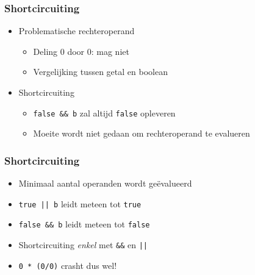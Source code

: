 \documentclass{../khlslides}
\begin{document}
\begin{frame}
  \frametitle{Shortcircuiting}
  \vskip4mm
  \begin{overprint}


  \end{overprint}
  \begin{itemize}
    \item Problematische rechteroperand
          \begin{itemize}
            \item Deling 0 door 0: mag niet
            \item Vergelijking tussen getal en boolean
          \end{itemize}
    \item Shortcircuiting
          \begin{itemize}
            \item {\tt false \&\& b} zal altijd {\tt false} opleveren
            \item Moeite wordt niet gedaan om rechteroperand te evalueren
          \end{itemize}
  \end{itemize}
\end{frame}


\begin{frame}
  \frametitle{Shortcircuiting}
  \begin{itemize}
    \item Minimaal aantal operanden wordt ge\"evalueerd
    \item {\tt true || b} leidt meteen tot {\tt true}
    \item {\tt false \&\& b} leidt meteen tot {\tt false}
    \item Shortcircuiting \emph{enkel} met {\tt \&\&} en {\tt ||}
    \item {\tt 0 * (0/0)} crasht dus wel!
  \end{itemize}
\end{frame}
\end{document}

